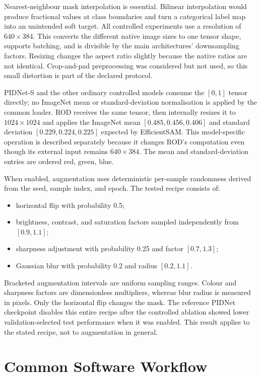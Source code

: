 Nearest-neighbour mask interpolation is essential. Bilinear interpolation
would produce fractional values at class boundaries and turn a categorical
label map into an unintended soft target. All controlled experiments use a
resolution of $640\times384$. This converts the different native image sizes
to one tensor shape, supports batching, and is divisible by the main
architectures' downsampling factors. Resizing changes the aspect ratio
slightly because the native ratios are not identical. Crop-and-pad
preprocessing was considered but not used, so this small distortion is part of
the declared protocol.

PIDNet-S and the other ordinary controlled models consume the $[0,1]$ tensor
directly; no ImageNet mean or standard-deviation normalisation is applied by
the common loader. ROD receives the same tensor, then internally resizes it to
$1024\times1024$ and applies the ImageNet mean
$[0.485,0.456,0.406]$ and standard deviation
$[0.229,0.224,0.225]$ expected by EfficientSAM. This model-specific operation
is described separately because it changes ROD's computation even though its
external input remains $640\times384$.
The mean and standard-deviation entries are ordered red, green, blue.

When enabled, augmentation uses deterministic per-sample randomness derived
from the seed, sample index, and epoch. The tested recipe consists of:
\begin{itemize}
  \item horizontal flip with probability 0.5;
  \item brightness, contrast, and saturation factors sampled independently
  from $[0.9,1.1]$;
  \item sharpness adjustment with probability 0.25 and factor $[0.7,1.3]$;
  \item Gaussian blur with probability 0.2 and radius $[0.2,1.1]$.
\end{itemize}
Bracketed augmentation intervals are uniform sampling ranges. Colour and
sharpness factors are dimensionless multipliers, whereas blur radius is
measured in pixels.
Only the horizontal flip changes the mask. The reference PIDNet checkpoint
disables this entire recipe after the controlled ablation showed lower
validation-selected test performance when it was enabled. This result applies
to the stated recipe, not to augmentation in general.

\section{Common Software Workflow}

